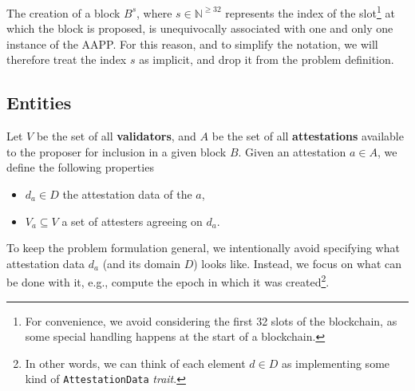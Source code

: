 \documentclass{article}
\begin{document}
\newcommand{\attestations}{\ensuremath{A}}
\newcommand{\solution}{\ensuremath{S}}
\newcommand{\attester}{\ensuremath{v}}
\newcommand{\attesters}[1]{\ensuremath{V_{#1}}}
\newcommand{\allattesters}{\ensuremath{V}}
\newcommand{\epoch}[1]{\ensuremath{e(#1)}}
\newcommand{\block}{\ensuremath{B}}
\newcommand{\attestation}{\ensuremath{a}}
\newcommand{\data}[1]{\ensuremath{d_{#1}}}
\newcommand{\Data}{\ensuremath{D}}
\newcommand{\epochs}{\ensuremath{E}}

The creation of a block $\block^{s}$, where $s \in \mathbb{N}^{\geq 32}$
represents the index of the slot\footnote{For convenience, we avoid considering
the first 32 slots of the blockchain, as some special handling happens at the
start of a blockchain.} at which the block is proposed, is unequivocally
associated with one and only one instance of the AAPP. For this reason, and to
simplify the notation, we will therefore treat the index $s$ as implicit, and
drop it from the problem definition.

\subsection{Entities}

Let \allattesters{} be the set of all \textbf{validators}, and \attestations{}
be the set of all \textbf{attestations} available to the proposer for inclusion
in a given block \block. Given an attestation $\attestation \in \attestations$,
we define the following properties
%
\begin{itemize}
  \item $\data{\attestation} \in \Data$ the attestation data of the \attestation{},
  \item $\attesters{\attestation} \subseteq \allattesters$ a set of attesters
  agreeing on \data{\attestation}.
\end{itemize}
%
To keep the problem formulation general, we intentionally avoid specifying what
attestation data \data{\attestation} (and its domain \Data) looks like.
Instead, we focus on what can be done with it, e.g., compute the epoch in
which it was created\footnote{In other words, we can think of each element $d
\in \Data$ as implementing some kind of \texttt{AttestationData}
\emph{trait}.}.
\end{document}
